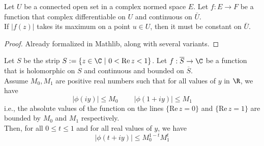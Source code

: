 \begin{theorem}
    \label{thm:maximum_modulus}
    \leanok
    Let $U$ be a connected open set in a complex normed space $E$. Let $f:E\to F$ be a function that
    complex differentiable on $U$ and continuous on $\bar{U}$.\\
    If $|f(z)|$ takes its maximum on a point $u\in U$, then it must be constant on $\bar{U}$.
\end{theorem}
\begin{proof}
    \leanok
    Already formalized in Mathlib, along with several variants.
\end{proof}


\begin{lemma}
    \label{lem:threelines}
    \leanok
    Let $S$ be the strip $S:=\{z \in \C \ | \ 0 < \mathrm{Re} \, z < 1 \}$. Let $f: \overline{S} \to \C$
    be a function that is holomorphic on $S$ and continuous and bounded on $\overline{S}$.\\
    Assume $M_0, M_1$ are positive real numbers such that for all values of $y$ in $\R$, we have
    \[| \phi(iy) | \leq M_0 \ \qquad | \phi(1+iy) | \leq M_1 \]
    i.e., the absolute values of the function on the lines $\{\mathrm{Re} \, z = 0\}$ and $\{\mathrm{Re} \, z = 1\}$ are bounded by $M_0$ and $M_1$ respectively.\\
    Then, for all $0 \leq t \leq 1$ and for all real values of $y$, we have
    \[  | \phi(t + iy) | \leq M_0^{1-t} M_1^t\]
\end{lemma}
